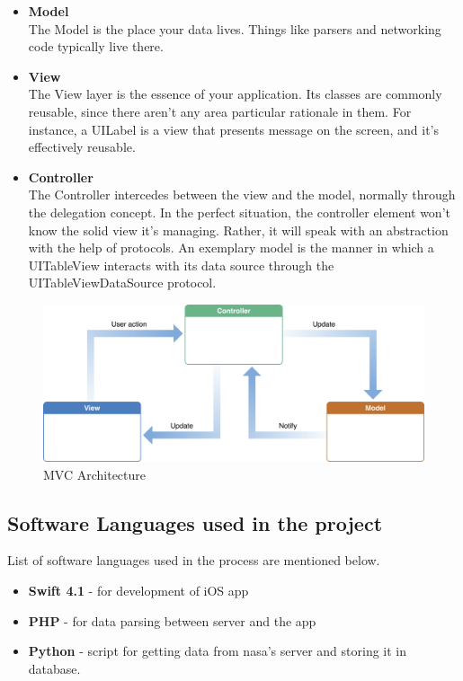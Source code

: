 \begin{itemize}
    \item \textbf{Model} \\
    The Model is the place your data lives. Things like parsers and networking code typically live there. \\
    
    \item \textbf{View} \\
    The View layer is the essence of your application. Its classes are commonly reusable, since there aren't any area particular rationale in them. For instance, a UILabel is a view that presents message on the screen, and it's effectively reusable. \\
  
    \item \textbf{Controller} \\
    The Controller intercedes between the view and the model, normally through the delegation concept. In the perfect situation, the controller element won't know the solid view it's managing. Rather, it will speak with an abstraction with the help of protocols. An exemplary model is the manner in which a UITableView interacts with its data source through the UITableViewDataSource protocol. \\
    
\end{itemize}

    \begin{figure}[H]
            \centering
            \includegraphics[width=1.0\linewidth]{figures/ch4/mvc.png}
            \caption{\label{fig:mvc} MVC Architecture \cite{MVC_Apple}}
        \end{figure}

\subsection{Software Languages used in the project}

List of software languages used in the process are mentioned below.

\begin{itemize}
    \item \textbf{Swift 4.1} - for development of iOS app \\
    \item \textbf{PHP} - for data parsing between server and the app \\
    \item \textbf{Python} - script for getting data from \gls{nasa}'s server and storing it in database. \\
\end{itemize}
